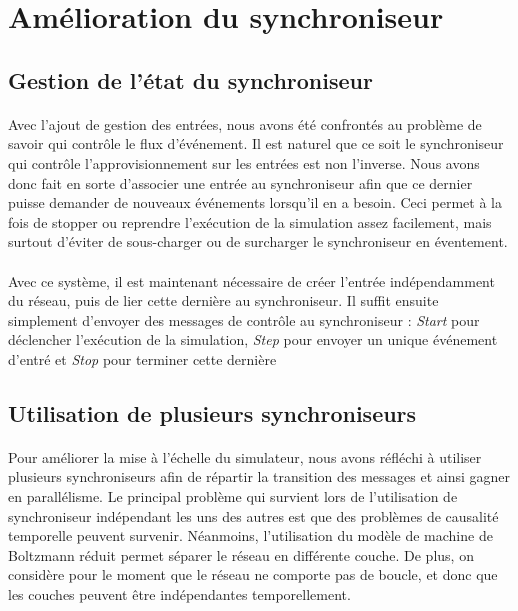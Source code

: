 \documentclass[a4paper,10pt]{article}
\begin{document}
\newpage
\section{Amélioration du synchroniseur}

\subsection{Gestion de l'état du synchroniseur}

\paragraph{}
Avec l'ajout de gestion des entrées, nous avons été confrontés au problème de savoir qui contrôle le flux d’événement. Il est naturel que ce soit le synchroniseur qui contrôle l’approvisionnement sur les entrées est non l'inverse. Nous avons donc fait en sorte d'associer une entrée au synchroniseur afin que ce dernier puisse demander de nouveaux événements lorsqu'il en a besoin. Ceci permet à la fois de stopper ou reprendre l’exécution de la simulation assez facilement, mais surtout d'éviter de sous-charger ou de surcharger le synchroniseur en éventement.

\paragraph{}
Avec ce système, il est maintenant nécessaire de créer l'entrée indépendamment du réseau, puis de lier cette dernière au synchroniseur. Il suffit ensuite simplement d'envoyer des messages de contrôle au synchroniseur : \emph{Start} pour déclencher l’exécution de la simulation, \emph{Step} pour envoyer un unique événement d'entré et \emph{Stop} pour terminer cette dernière

\subsection{Utilisation de plusieurs synchroniseurs}

\paragraph{}
Pour améliorer la mise à l'échelle du simulateur, nous avons réfléchi à utiliser plusieurs synchroniseurs afin de répartir la transition des messages et ainsi gagner en parallélisme. Le principal problème qui survient lors de l'utilisation de synchroniseur indépendant les uns des autres est que des problèmes de causalité temporelle peuvent survenir. Néanmoins, l'utilisation du modèle de machine de Boltzmann réduit  permet séparer le réseau en différente couche. De plus, on considère pour le moment que le réseau ne comporte pas de boucle, et donc que les couches peuvent être indépendantes temporellement.
\end{document}
